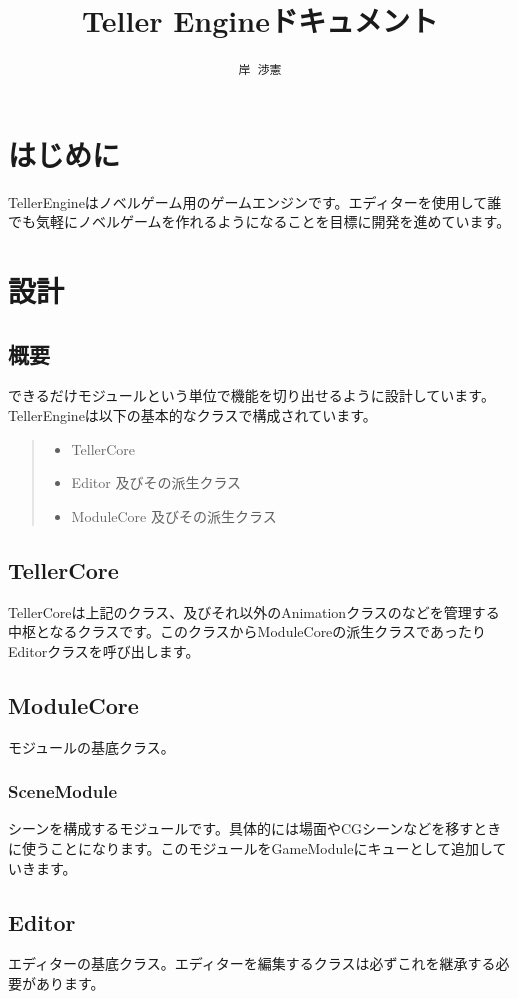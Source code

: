 \documentclass[12pt,a4paper,uplatex,dvipdfmx]{jsarticle}
\begin{document}
\title{Teller Engineドキュメント}
\author{\texttt{岸 渉憲}}

\maketitle

\section*{はじめに}
TellerEngineはノベルゲーム用のゲームエンジンです。エディターを使用して誰でも気軽にノベルゲームを作れるようになることを目標に開発を進めています。

\section{設計}
\subsection{概要}
できるだけモジュールという単位で機能を切り出せるように設計しています。
TellerEngineは以下の基本的なクラスで構成されています。
\begin{quote}
  \begin{itemize}
    \item TellerCore
    \item Editor 及びその派生クラス
    \item ModuleCore 及びその派生クラス
  \end{itemize}
\end{quote}
\subsection{TellerCore}
TellerCoreは上記のクラス、及びそれ以外のAnimationクラスのなどを管理する中枢となるクラスです。このクラスからModuleCoreの派生クラスであったりEditorクラスを呼び出します。
\subsection{ModuleCore}
モジュールの基底クラス。

\subsubsection{SceneModule}
シーンを構成するモジュールです。具体的には場面やCGシーンなどを移すときに使うことになります。このモジュールをGameModuleにキューとして追加していきます。

\subsection{Editor}
エディターの基底クラス。エディターを編集するクラスは必ずこれを継承する必要があります。
\end{document}
